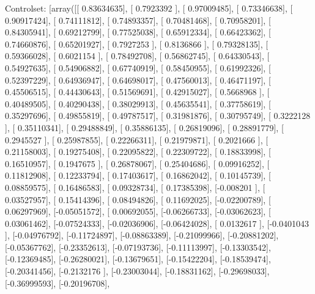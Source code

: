 \documentclass{article}
\begin{document}
Controlset: [array([[ 0.83634635],
       [ 0.7923392 ],
       [ 0.97009485],
       [ 0.73346638],
       [ 0.90917424],
       [ 0.74111812],
       [ 0.74893357],
       [ 0.70481468],
       [ 0.70958201],
       [ 0.84305941],
       [ 0.69212799],
       [ 0.77525038],
       [ 0.65912334],
       [ 0.66423362],
       [ 0.74660876],
       [ 0.65201927],
       [ 0.7927253 ],
       [ 0.8136866 ],
       [ 0.79328135],
       [ 0.59366028],
       [ 0.6021154 ],
       [ 0.78492708],
       [ 0.56862745],
       [ 0.64330543],
       [ 0.54927635],
       [ 0.54906882],
       [ 0.67740919],
       [ 0.58450955],
       [ 0.61992326],
       [ 0.52397229],
       [ 0.64936947],
       [ 0.64698017],
       [ 0.47560013],
       [ 0.46471197],
       [ 0.45506515],
       [ 0.44430643],
       [ 0.51569691],
       [ 0.42915027],
       [ 0.5668968 ],
       [ 0.40489505],
       [ 0.40290438],
       [ 0.38029913],
       [ 0.45635541],
       [ 0.37758619],
       [ 0.35297696],
       [ 0.49855819],
       [ 0.49787517],
       [ 0.31981876],
       [ 0.30795749],
       [ 0.3222128 ],
       [ 0.35110341],
       [ 0.29488849],
       [ 0.35886135],
       [ 0.26819096],
       [ 0.28891779],
       [ 0.2945527 ],
       [ 0.25987855],
       [ 0.22266311],
       [ 0.21979871],
       [ 0.2021666 ],
       [ 0.21158003],
       [ 0.19275408],
       [ 0.22095822],
       [ 0.22309722],
       [ 0.18833998],
       [ 0.16510957],
       [ 0.1947675 ],
       [ 0.26878067],
       [ 0.25404686],
       [ 0.09916252],
       [ 0.11812908],
       [ 0.12233794],
       [ 0.17403617],
       [ 0.16862042],
       [ 0.10145739],
       [ 0.08859575],
       [ 0.16486583],
       [ 0.09328734],
       [ 0.17385398],
       [-0.008201  ],
       [ 0.03527957],
       [ 0.15414396],
       [ 0.08494826],
       [ 0.11692025],
       [-0.02200789],
       [ 0.06297969],
       [-0.05051572],
       [ 0.00692055],
       [-0.06266733],
       [-0.03062623],
       [ 0.03061462],
       [-0.07524333],
       [-0.02036906],
       [-0.06424028],
       [ 0.0132617 ],
       [-0.0401043 ],
       [-0.04976792],
       [-0.11724897],
       [-0.08863389],
       [-0.21099966],
       [-0.20881202],
       [-0.05367762],
       [-0.23352613],
       [-0.07193736],
       [-0.11113997],
       [-0.13303542],
       [-0.12369485],
       [-0.26280021],
       [-0.13679651],
       [-0.15422204],
       [-0.18539474],
       [-0.20341456],
       [-0.2132176 ],
       [-0.23003044],
       [-0.18831162],
       [-0.29698033],
       [-0.36999593],
       [-0.20196708],
\end{document}
